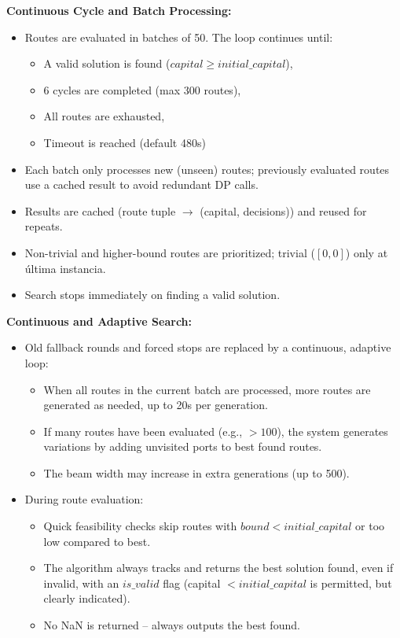 \documentclass[12pt]{article}
\begin{document}
\textbf{Continuous Cycle and Batch Processing:}
\begin{itemize}
    \item Routes are evaluated in batches of 50. The loop continues until:
        \begin{itemize}
            \item A valid solution is found ($capital \geq initial\_capital$),
            \item 6 cycles are completed (max 300 routes),
            \item All routes are exhausted,
            \item Timeout is reached (default 480s)
        \end{itemize}
    \item Each batch only processes new (unseen) routes; previously evaluated routes use a cached result to avoid redundant DP calls.
    \item Results are cached (route tuple $\to$ (capital, decisions)) and reused for repeats.
    \item Non-trivial and higher-bound routes are prioritized; trivial ($[0,0]$) only at última instancia.
    \item Search stops immediately on finding a valid solution.
\end{itemize}

\textbf{Continuous and Adaptive Search:}
\begin{itemize}
    \item Old fallback rounds and forced stops are replaced by a continuous, adaptive loop:
        \begin{itemize}
            \item When all routes in the current batch are processed, more routes are generated as needed, up to 20s per generation.
            \item If many routes have been evaluated (e.g., $>100$), the system generates variations by adding unvisited ports to best found routes.
            \item The beam width may increase in extra generations (up to 500).
        \end{itemize}
    \item During route evaluation:
        \begin{itemize}
            \item Quick feasibility checks skip routes with $bound < initial\_capital$ or too low compared to best.
            \item The algorithm always tracks and returns the best solution found, even if invalid, with an $is\_valid$ flag (capital $< initial\_capital$ is permitted, but clearly indicated).
            \item No NaN is returned -- always outputs the best found.
        \end{itemize}
\end{itemize}
\end{document}
